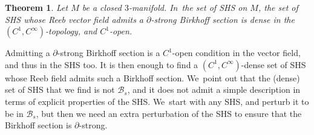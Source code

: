 \documentclass[JEP,XML,SOM,Unicode,NoEqCountersInSection,NoFloatCountersInSection,published]{cedram}
\newcommand{\threemanifold}{$3$\nobreakdash-mani\-fold\xspace}
\newtheorem{theorem}{Theorem}[section]
\theoremstyle{definition}
\begin{document}
\begin{theorem}\label{thm:C1generic}
Let $M$ be a closed \threemanifold. In~the set of SHS on $M$, the set of SHS whose Reeb vector field admits a $\partial$-strong Birkhoff section is dense in the $(C^1,C^\infty)$-topology, and $C^1$-open.
\end{theorem}

Admitting a $\partial$-strong Birkhoff section is a $C^1$-open condition in the vector field, and thus in the SHS too. It is then enough to find a $(C^1,C^\infty)$-dense set of SHS whose Reeb field admits such a Birkhoff section. We~point out that the (dense) set of SHS that we find is not $\mathcal{B}_s$, and it does not admit a simple description in terms of explicit properties of the SHS. We~start with any SHS, and perturb it to be in $\mathcal{B}_s$, but then we need an extra perturbation of the SHS to ensure that the Birkhoff section is $\partial$-strong.
\end{document}
